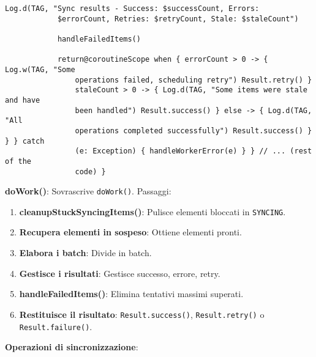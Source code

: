 \begin{lstlisting}[caption=SyncWorker.kt, label=lst:syncworker, basicstyle=\ttfamily\scriptsize, breaklines=true, breakatwhitespace=true, tabsize=4]
            Log.d(TAG, "Sync results - Success: $successCount, Errors:
            $errorCount, Retries: $retryCount, Stale: $staleCount")

            handleFailedItems()

            return@coroutineScope when { errorCount > 0 -> { Log.w(TAG, "Some
                operations failed, scheduling retry") Result.retry() }
                staleCount > 0 -> { Log.d(TAG, "Some items were stale and have
                been handled") Result.success() } else -> { Log.d(TAG, "All
                operations completed successfully") Result.success() } } } catch
                (e: Exception) { handleWorkerError(e) } } // ... (rest of the
                code) }
\end{lstlisting}

\textbf{doWork()}: Sovrascrive \texttt{doWork()}.
Passaggi:
\begin{enumerate}
    \item \textbf{cleanupStuckSyncingItems()}: Pulisce elementi bloccati in
    \texttt{SYNCING}.
    \item \textbf{Recupera elementi in sospeso}: Ottiene elementi pronti.
    \item \textbf{Elabora i batch}: Divide in batch.
    \item \textbf{Gestisce i risultati}: Gestisce successo, errore, retry.
    \item \textbf{handleFailedItems()}: Elimina tentativi massimi superati.
    \item \textbf{Restituisce il risultato}: \texttt{Result.success()},
    \texttt{Result.retry()} o \texttt{Result.failure()}.
\end{enumerate}

\textbf{Operazioni di sincronizzazione}:

